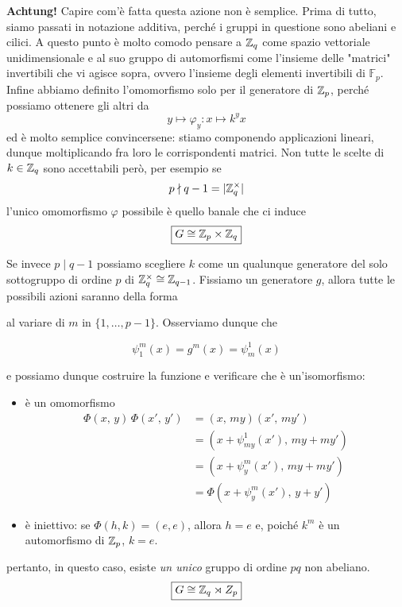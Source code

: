 \begin{multicols}{2}
\textbf{Achtung!} Capire com'è fatta questa azione non è semplice. Prima di tutto, siamo passati in notazione additiva, perché i gruppi in questione sono abeliani e cilici. A questo punto è molto comodo pensare a $ \mathbb{Z}_q $ come spazio vettoriale unidimensionale e al suo gruppo di automorfismi come l'insieme delle "matrici" invertibili che vi agisce sopra, ovvero l'insieme degli elementi invertibili di $ \mathbb{F}_p $. Infine abbiamo definito l'omomorfismo solo per il generatore di $ \mathbb{Z}_p $, perché possiamo ottenere gli altri da
\[ y \mapsto \varphi_y : x \mapsto k^yx \]
ed è molto semplice convincersene: stiamo componendo applicazioni lineari, dunque moltiplicando fra loro le corrispondenti matrici.
Non tutte le scelte di $ k \in \mathbb{Z}_q $ sono accettabili però, per esempio se 
$$  p \nmid q-1 = |\mathbb{Z}_q^\times| $$
l'unico omomorfismo $ \varphi $ possibile è quello banale che ci induce
\[ \boxed{G \cong \mathbb{Z}_p \times \mathbb{Z}_q} \]

Se invece 
$ p \mid q -1 $
possiamo scegliere $ k $ come un qualunque generatore del solo sottogruppo di ordine $ p $ di $ \mathbb{Z}_q^\times \cong \mathbb{Z}_{q-1} $. Fissiamo un generatore $ g $, allora tutte le possibili azioni saranno della forma

al variare di $ m $ in $ \{1, \dots, p-1\} $.
Osserviamo dunque che

\[ \psi^m_1(x) = g^{m}(x) = \psi^1_m(x) \]


e possiamo dunque costruire la funzione
e verificare che è un'isomorfismo:
\begin{itemize}
	\item è un omomorfismo
	\begin{align*} \Phi(x,\, y)\,\Phi(x',\, y') &= (x,\, my)(x',\, my') \\&= (x + \psi_{my}^1(x'), \,my + my')
	\\&= (x + \psi_y^{m}(x'),\, my + my') \\&= \Phi(x + \psi^m_y(x'),\, y + y')  \end{align*} 
	\item è iniettivo: se $ \Phi(h, k) = (e, e) $, allora $ h = e $ e, poiché $ k^m $ è un automorfismo di $ \mathbb{Z}_p $, $ k = e $.
\end{itemize}
pertanto, in questo caso, esiste \emph{un unico} gruppo di ordine $ pq $ non abeliano. 
\[ \boxed{G \cong \mathbb{Z}_q \rtimes Z_p} \]



\end{multicols}

